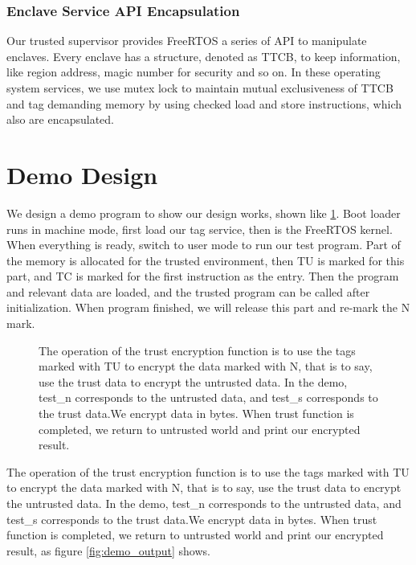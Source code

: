 \documentclass[conference]{IEEEtran}
\begin{document}
\subsubsection{Enclave Service API Encapsulation}

Our trusted supervisor provides FreeRTOS a series of API to manipulate enclaves. Every enclave has a structure, denoted as TTCB, to keep information, like region address, magic number for security and so on. In these operating system services, we use mutex lock to maintain mutual exclusiveness of TTCB and tag demanding memory by using checked load and store instructions, which also are encapsulated.

\section{Demo Design}
We design a demo program to show our design works, shown like \ref{fig:demo_code}. Boot loader runs in machine mode, first load our tag service, then is the FreeRTOS kernel. When everything is ready, switch to user mode to run our test program. Part of the memory is allocated for the trusted environment, then TU is marked for this part, and TC is marked for the first instruction as the entry. Then the program and relevant data are loaded, and the trusted program can be called after initialization. When program finished, we will release this part and re-mark the N mark.

\begin{figure}
	\caption{The operation of the trust encryption function is to use the tags marked with TU to encrypt the data marked with N, that is to say, use the trust data to encrypt the untrusted data. In the demo, test\_n corresponds to the untrusted data, and test\_s corresponds to the trust data.We encrypt data in bytes. When  trust function is completed, we return to untrusted world and print our encrypted result.}
	\label{fig:demo_code}
\end{figure}

The operation of the trust encryption function is to use the tags marked with TU to encrypt the data marked with N, that is to say, use the trust data to encrypt the untrusted data. In the demo, test\_n corresponds to the untrusted data, and test\_s corresponds to the trust data.We encrypt data in bytes. When  trust function is completed, we return to untrusted world and print our encrypted result, as figure \ref{fig:demo_output} shows.
\end{document}
